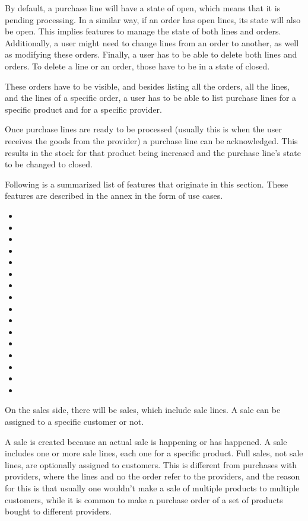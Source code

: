 By default, a purchase line will have a state of open, which means that it is pending processing. In a similar way, if an order has open lines, its state will also be open. This implies features to manage the state of both lines and orders. Additionally, a user might need to change lines from an order to another, as well as modifying these orders. Finally, a user has to be able to delete both lines and orders. To delete a line or an order, those have to be in a state of closed.

These orders have to be visible, and besides listing all the orders, all the lines, and the lines of a specific order, a user has to be able to list purchase lines for a specific product and for a specific provider.

Once purchase lines are ready to be processed (usually this is when the user receives the goods from the provider) a purchase line can be acknowledged. This results in the stock for that product being increased and the purchase line’s state to be changed to closed.

Following is a summarized list of features that originate in this section. These features are described in the annex in the form of use cases.
\hfill\break
\begin{itemize}
\item {}
\item {}
\item {}
\item {}
\item {}
\item {}
\item {}
\item {}
\item {}
\item {}
\item {}
\item {}
\item {}
\item {}
\item {}
\item {}
\end{itemize}
\hfill\break
On the sales side, there will be sales, which include sale lines. A sale can be assigned to a specific customer or not.

A sale is created because an actual sale is happening or has happened. A sale includes one or more sale lines, each one for a specific product. Full sales, not sale lines, are optionally assigned to customers. This is different from purchases with providers, where the lines and no the order refer to the providers, and the reason for this is that usually one wouldn’t make a sale of multiple products to multiple customers, while it is common to make a purchase order of a set of products bought to different providers.

